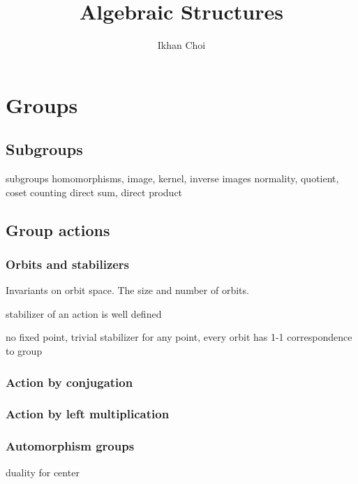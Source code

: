 \documentclass{../note}
\begin{document}
\title{Algebraic Structures}
\author{Ikhan Choi}
\maketitle
\tableofcontents

\part{Groups}
\chapter{Subgroups}
subgroups
homomorphisms, image, kernel, inverse images
normality, quotient, coset counting
direct sum, direct product

\chapter{Group actions}
\section{Orbits and stabilizers}
Invariants on orbit space.
The size and number of orbits.

\begin{prb}
stabilizer of an action is well defined

\end{prb}

\begin{prb}
no fixed point,
trivial stabilizer for any point,
every orbit has 1-1 correspondence to group
\end{prb}

\section{Action by conjugation}
\section{Action by left multiplication}


\section{Automorphism groups}
\begin{prb}
duality for center
\end{prb}
\end{document}
